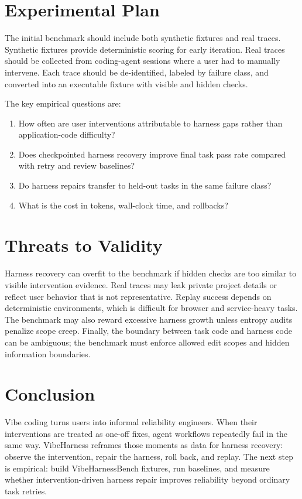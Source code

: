 \documentclass[11pt]{article}
\begin{document}
\section{Experimental Plan}

The initial benchmark should include both synthetic fixtures and real traces.
Synthetic fixtures provide deterministic scoring for early iteration. Real traces
should be collected from coding-agent sessions where a user had to manually
intervene. Each trace should be de-identified, labeled by failure class, and
converted into an executable fixture with visible and hidden checks.

The key empirical questions are:

\begin{enumerate}[leftmargin=*]
  \item How often are user interventions attributable to harness gaps rather
  than application-code difficulty?
  \item Does checkpointed harness recovery improve final task pass rate compared
  with retry and review baselines?
  \item Do harness repairs transfer to held-out tasks in the same failure class?
  \item What is the cost in tokens, wall-clock time, and rollbacks?
\end{enumerate}

\section{Threats to Validity}

Harness recovery can overfit to the benchmark if hidden checks are too similar to
visible intervention evidence. Real traces may leak private project details or
reflect user behavior that is not representative. Replay success depends on
deterministic environments, which is difficult for browser and service-heavy
tasks. The benchmark may also reward excessive harness growth unless entropy
audits penalize scope creep. Finally, the boundary between task code and harness
code can be ambiguous; the benchmark must enforce allowed edit scopes and hidden
information boundaries.

\section{Conclusion}

Vibe coding turns users into informal reliability engineers. When their
interventions are treated as one-off fixes, agent workflows repeatedly fail in
the same way. VibeHarness reframes those moments as data for harness recovery:
observe the intervention, repair the harness, roll back, and replay. The next
step is empirical: build VibeHarnessBench fixtures, run baselines, and measure
whether intervention-driven harness repair improves reliability beyond ordinary
task retries.
\end{document}
